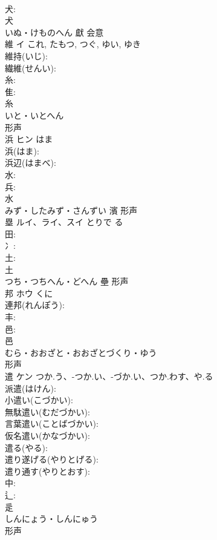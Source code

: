 \documentclass[8pt]{extreport}
\begin{document}
\begin{CJK}{UTF8}{min}
\\	犬: 
\\	犬	
\\	いぬ・けものへん	獻	会意 
\\	維	イ		これ, たもつ, つぐ, ゆい, ゆき	
\\	維持(いじ): 
\\	繊維(せんい): 
\\	糸: 
\\	隹: 
\\	糸	
\\	いと・いとへん	
\\	形声 
\\	浜	ヒン	はま		
\\	浜(はま): 
\\	浜辺(はまべ): 
\\	水: 
\\	兵: 
\\	水	
\\	みず・したみず・さんずい	濱	形声 
\\	塁	ルイ、ライ、スイ	とりで	る	
\\	田: 
\\	冫: 
\\	土: 
\\	土	
\\	つち・つちへん・どへん	壘	形声 
\\	邦	ホウ	くに		
\\	連邦(れんぽう): 
\\	丰: 
\\	邑: 
\\	邑	
\\	むら・おおざと・おおざとづくり・ゆう	
\\	形声 
\\	遣	ケン	つか.う、-つか.い、-づか.い、つか.わす、や.る		
\\	派遣(はけん): 
\\	小遣い(こづかい): 
\\	無駄遣い(むだづかい): 
\\	言葉遣い(ことばづかい): 
\\	仮名遣い(かなづかい): 
\\	遣る(やる): 
\\	遣り遂げる(やりとげる): 
\\	遣り通す(やりとおす): 
\\	中: 
\\	辶: 
\\	辵	
\\	しんにょう・しんにゅう	
\\	形声 

\end{CJK}
\end{document}
